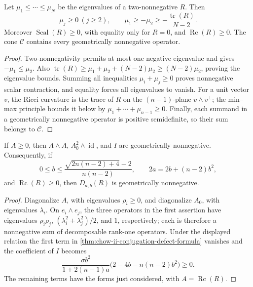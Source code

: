 \begin{lemma}
  \label{lem:chow-ii-two-nonnegative-consequences}
  Let \(\mu_1\le\cdots\le\mu_N\) be the eigenvalues of a two-nonnegative
  \(R\).  Then
  \[
    \mu_j\ge0\ (j\ge2),\qquad
    \mu_1\ge-\mu_2\ge-\frac{\operatorname{tr}(R)}{N-2}.
  \]
  Moreover \(\operatorname{Scal}(R)\ge0\), with equality only for \(R=0\),
  and \(\operatorname{Rc}(R)\ge0\).  The cone \(\mathcal C\) contains every
  geometrically nonnegative operator.
\end{lemma}
\begin{proof}
\sketch
  Two-nonnegativity permits at most one negative eigenvalue and gives
  \(-\mu_1\le\mu_2\).  Also
  \(\operatorname{tr}(R)\ge\mu_1+\mu_2+(N-2)\mu_2\ge(N-2)\mu_2\), proving
  the eigenvalue bounds.  Summing all inequalities \(\mu_i+\mu_j\ge0\)
  proves nonnegative scalar contraction, and equality forces all eigenvalues
  to vanish.  For a unit vector \(v\), the Ricci curvature is the trace of
  \(R\) on the \((n-1)\)-plane \(v\wedge v^\perp\); the min--max principle
  bounds it below by \(\mu_1+\cdots+\mu_{n-1}\ge0\).  Finally, each summand in
  a geometrically nonnegative operator is positive semidefinite, so their sum
  belongs to \(\mathcal C\).
\end{proof}

\begin{lemma}
  \label{lem:chow-ii-geometric-nonnegativity-defect}
  If \(A\ge0\), then \(A\wedge A\), \(A_0^2\wedge\operatorname{id}\), and
  \(I\) are geometrically nonnegative.  Consequently, if
  \[
  0\le b\le\frac{\sqrt{2n(n-2)+4}-2}{n(n-2)},
  \qquad 2a=2b+(n-2)b^2,
  \]
  and \(\operatorname{Rc}(R)\ge0\), then \(D_{a,b}(R)\) is geometrically
  nonnegative.
\end{lemma}
\begin{proof}
\sketch
  Diagonalize \(A\), with eigenvalues \(\rho_i\ge0\), and diagonalize
  \(A_0\), with eigenvalues \(\lambda_i\).  On \(e_i\wedge e_j\), the three
  operators in the first assertion have eigenvalues
  \(\rho_i\rho_j\), \((\lambda_i^2+\lambda_j^2)/2\), and \(1\), respectively;
  each is therefore a nonnegative sum of decomposable rank-one operators.
  Under the displayed relation the first term in
  \ref{thm:chow-ii-conjugation-defect-formula} vanishes and the coefficient
  of \(I\) becomes
  \[
  \frac{\sigma b^2}{1+2(n-1)a}\bigl(2-4b-n(n-2)b^2\bigr)\ge0.
  \]
  The remaining terms have the forms just considered, with
  \(A=\operatorname{Rc}(R)\).
\end{proof}

